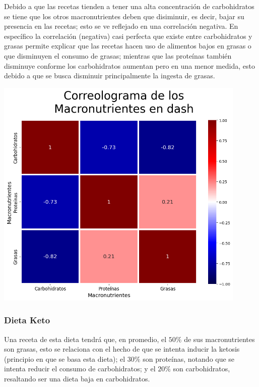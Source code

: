 \documentclass[12pt,a4paper]{article}
\begin{document}
            Debido a que las recetas tienden a tener una alta concentración de carbohidratos 
            se tiene que los otros macronutrientes deben que disiminuir, es decir, bajar 
            su presencia en las recetas; esto se ve reflejado en una correlación negativa. En 
            específico la correlación (negativa) casi perfecta que existe entre carbohidratos y 
            grasas permite explicar que las recetas hacen uso de alimentos bajos en grasas o que 
            disminuyen el consumo de grasas; mientras que las proteínas también disminuye conforme 
            los carbohidratos aumentan pero en una menor medida, esto debido a que se busca disminuir 
            principalmente la ingesta de grasas.

            \begin{center}
                \includegraphics[width=0.90\textwidth]{Resources/2_03_plot_01_4.png}
            \end{center}

        \subsubsection{Dieta Keto}

            Una receta de esta dieta tendrá que, en promedio, el $50\%$ de 
            sus macronutrientes son grasas, esto se relaciona con el hecho de 
            que se intenta inducir la ketosis (principio en que se basa esta         
            dieta); el $30\%$ son proteínas, notando que se intenta reducir 
            el consumo de carbohidratos; y el $20\%$ son carbohidratos, 
            resaltando ser una dieta baja en carbohidratos.\\
\end{document}
